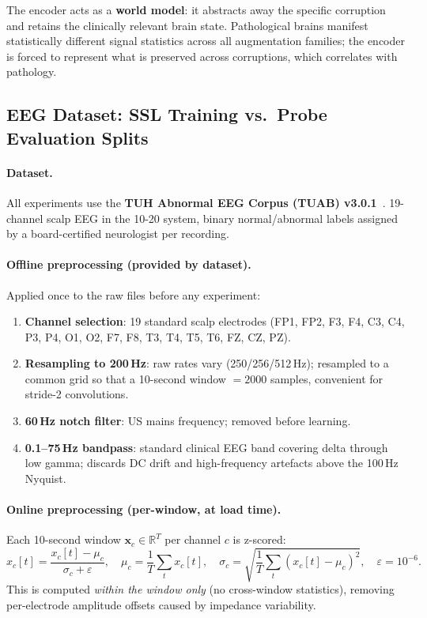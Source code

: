 \documentclass[11pt,a4paper]{article}
\begin{document}
The encoder acts as a \textbf{world model}: it abstracts away the specific corruption and
retains the clinically relevant brain state.  Pathological brains manifest statistically
different signal statistics across all augmentation families; the encoder is forced to
represent what is preserved across corruptions, which correlates with pathology.

\subsection{EEG Dataset: SSL Training vs.\ Probe Evaluation Splits}
\label{sec:dataset}

\paragraph{Dataset.}
All experiments use the \textbf{TUH Abnormal EEG Corpus (TUAB) v3.0.1}~\cite{tuab}.
19-channel scalp EEG in the 10-20 system, binary normal/abnormal labels assigned
by a board-certified neurologist per recording.

\paragraph{Offline preprocessing (provided by dataset).}
Applied once to the raw files before any experiment:
\begin{enumerate}[noitemsep]
  \item \textbf{Channel selection}: 19 standard scalp electrodes (FP1, FP2, F3, F4, C3, C4,
    P3, P4, O1, O2, F7, F8, T3, T4, T5, T6, FZ, CZ, PZ).
  \item \textbf{Resampling to 200\,Hz}: raw rates vary (250/256/512\,Hz); resampled to a
    common grid so that a 10-second window $= 2000$ samples, convenient for stride-2 convolutions.
  \item \textbf{60\,Hz notch filter}: US mains frequency; removed before learning.
  \item \textbf{0.1--75\,Hz bandpass}: standard clinical EEG band covering delta through low gamma;
    discards DC drift and high-frequency artefacts above the 100\,Hz Nyquist.
\end{enumerate}

\paragraph{Online preprocessing (per-window, at load time).}
Each 10-second window $\mathbf{x}_c \in \mathbb{R}^T$ per channel $c$ is z-scored:
\begin{equation}
  \hat{x}_c[t] = \frac{x_c[t] - \mu_c}{\sigma_c + \varepsilon}, \quad
  \mu_c = \frac{1}{T}\sum_t x_c[t], \quad
  \sigma_c = \sqrt{\frac{1}{T}\sum_t (x_c[t]-\mu_c)^2}, \quad
  \varepsilon = 10^{-6}.
\end{equation}
This is computed \emph{within the window only} (no cross-window statistics), removing
per-electrode amplitude offsets caused by impedance variability.
\end{document}

